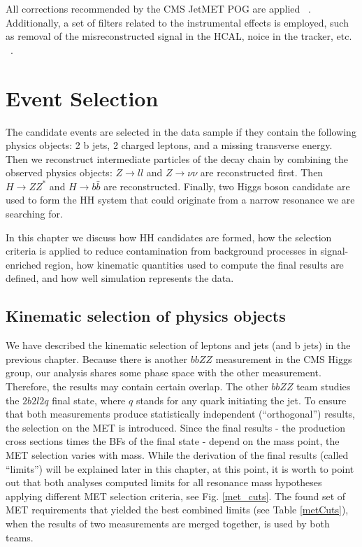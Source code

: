All corrections recommended by the CMS JetMET POG are applied ~\cite{MissingETRun2Corrections}. Additionally, a set of filters related to the instrumental effects is employed, such as removal of the misreconstructed signal in the HCAL, noice in the tracker, etc. ~\cite{MissingETOptionalFiltersRun2}. 



\section{Event Selection}\label{sec:selection}

The candidate events are selected in the data sample if they contain the following physics objects: 2 b jets, 2 charged leptons, and a missing transverse energy. Then we reconstruct intermediate particles of the decay chain by combining the observed physics objects: $Z \to ll$ and $Z \to \nu \nu$ are reconstructed first. Then $H \to ZZ^*$ and $H \to b\bar{b}$ are reconstructed. Finally, two Higgs boson candidate are used to form the HH system that could originate from a narrow resonance we are searching for.

In this chapter we discuss how HH candidates are formed, how the selection criteria is applied to reduce contamination from background processes in signal-enriched region, how kinematic quantities used to compute the final results are defined, and how well simulation represents the data.



\subsection{Kinematic selection of physics objects}
We have described the kinematic selection of leptons and jets (and b jets) in the previous chapter. Because there is another $bbZZ$ measurement in the CMS Higgs group, our analysis shares some phase space with the other measurement. Therefore, the results may contain certain overlap. The other $bbZZ$ team studies the $2 b 2 l 2 q$ final state, where $q$ stands for any quark initiating the jet. To ensure that both measurements produce statistically independent (``orthogonal'') results, the selection on the MET is introduced. Since the final results - the production cross sections times the BFs of the final state - depend on the mass point, the MET selection varies with mass. While the derivation of the final results (called ``limits'') will be explained later in this chapter, at this point, it is worth to point out that both analyses computed limits for all resonance mass hypotheses applying different MET selection criteria, see Fig. \ref{met_cuts}. The found set of MET requirements that yielded the best combined limits (see Table \ref{metCuts}), when the results of two measurements are merged together, is used by both teams. 



